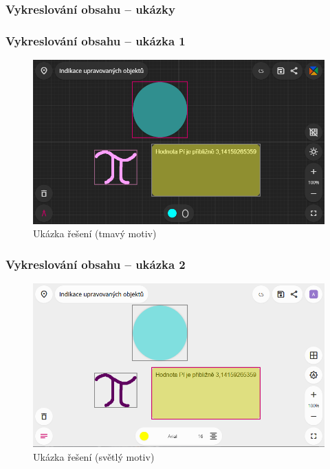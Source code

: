 \documentclass{beamer}
\begin{document}
\subsubsection{Vykreslování obsahu -- ukázky}
\begin{frame}
    \frametitle{Vykreslování obsahu -- ukázka 1}
    \begin{figure}
        \centering
        \includegraphics[width=1\textwidth]{Figures/ObjectIndication2.png}
        \caption{Ukázka řešení (tmavý motiv)}
    \end{figure}
\end{frame}

\begin{frame}
    \frametitle{Vykreslování obsahu -- ukázka 2}
    \begin{figure}
        \centering
        \includegraphics[width=1\textwidth]{Figures/ObjectIndication3.png}
        \caption{Ukázka řešení (světlý motiv)}
    \end{figure}
\end{frame}
\end{document}
